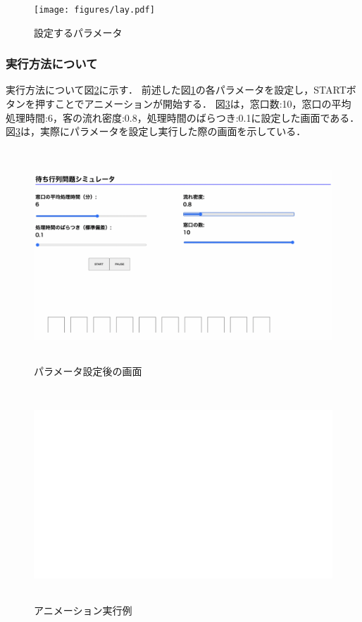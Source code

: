 \documentclass[12pt,a4j]{ltjsarticle}
\begin{document}
\begin{figure}[h]
\begin{center}
\texttt{[image: figures/lay.pdf]}
\caption{設定するパラメータ}
\label{fig:layout_ex}
\end{center}
\end{figure}

\clearpage

\subsubsection{実行方法について}
実行方法について図\ref{fig:設定}に示す．
前述した図\ref{fig:layout_ex}の各パラメータを設定し，STARTボタンを押すことでアニメーションが開始する．
図\ref{fig:アニメ実行}は，窓口数:10，窓口の平均処理時間:6，客の流れ密度:0.8，処理時間のばらつき:0.1に設定した画面である．
図\ref{fig:アニメ実行}は，実際にパラメータを設定し実行した際の画面を示している．
\begin{figure}[h]
\begin{center}
\includegraphics[height = 80mm ] {figures/lay_para.pdf}
\caption{パラメータ設定後の画面}
\label{fig:設定}
\end{center}
\end{figure}

\begin{figure}[h]
\begin{center}
\includegraphics[height = 80mm ] {figures/figure_sample.pdf}
\caption{アニメーション実行例}
\label{fig:アニメ実行}
\end{center}
\end{figure}
\end{document}
